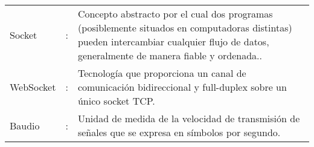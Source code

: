 \newpage
\begin{tabular}{lcp{10.5cm}}
Socket &:& Concepto abstracto por el cual dos programas (posiblemente situados en computadoras distintas) pueden intercambiar cualquier flujo de datos, generalmente de manera fiable y ordenada..\\

WebSocket &:& Tecnología que proporciona un canal de comunicación bidireccional y full-duplex sobre un único socket TCP.\\

Baudio &:& Unidad de medida de la velocidad de transmisión de señales que se expresa en símbolos por segundo.\\

\end{tabular}
